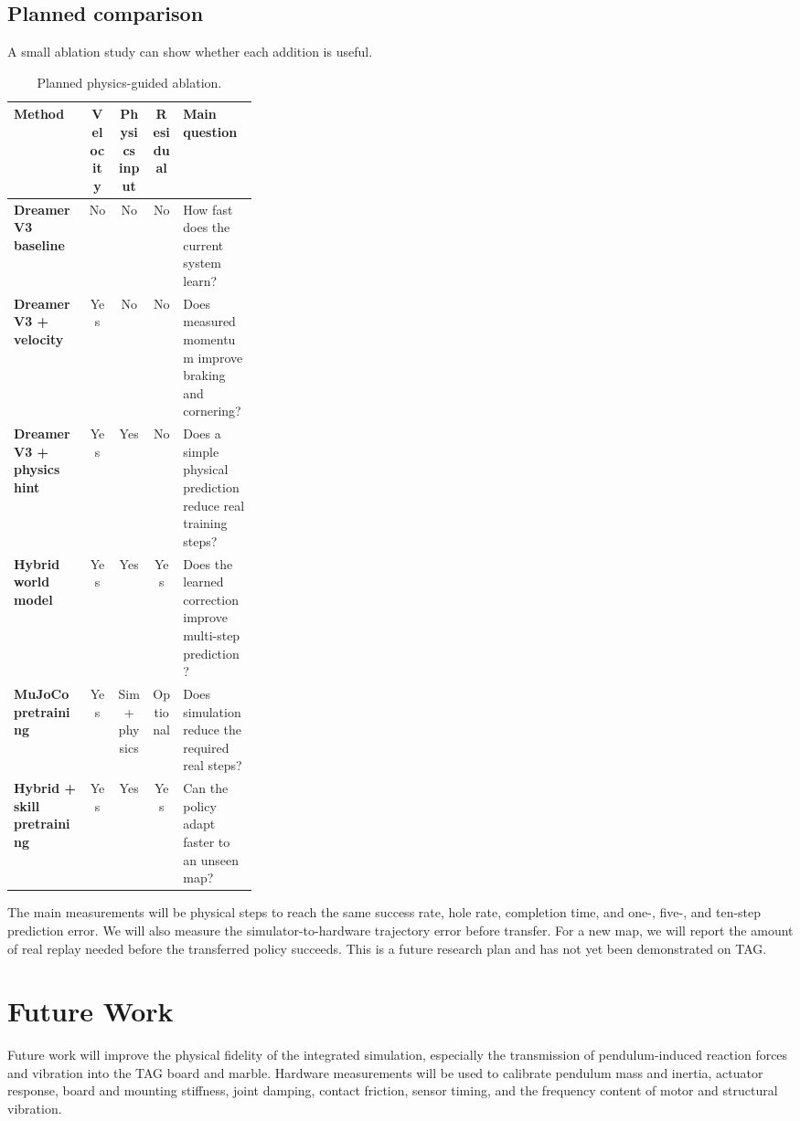 \documentclass[9pt]{extarticle}
\begin{document}
\subsection{Planned comparison}
A small ablation study can show whether each addition is useful.
\begin{table}[H]
\centering
\small
\caption{Planned physics-guided ablation.}
\begin{tabularx}{0.96\linewidth}{>{\bfseries}p{0.31\linewidth} c c c X}
\toprule
Method & Velocity & Physics input & Residual & Main question \\
\midrule
DreamerV3 baseline & No & No & No & How fast does the current system learn? \\
DreamerV3 + velocity & Yes & No & No & Does measured momentum improve braking and cornering? \\
DreamerV3 + physics hint & Yes & Yes & No & Does a simple physical prediction reduce real training steps? \\
Hybrid world model & Yes & Yes & Yes & Does the learned correction improve multi-step prediction? \\
MuJoCo pretraining & Yes & Sim + physics & Optional & Does simulation reduce the required real steps? \\
Hybrid + skill pretraining & Yes & Yes & Yes & Can the policy adapt faster to an unseen map? \\
\bottomrule
\end{tabularx}
\end{table}

The main measurements will be physical steps to reach the same success rate, hole rate, completion time, and one-, five-, and ten-step prediction error. We will also measure the simulator-to-hardware trajectory error before transfer. For a new map, we will report the amount of real replay needed before the transferred policy succeeds. This is a future research plan and has not yet been demonstrated on TAG.

\section{Future Work}
Future work will improve the physical fidelity of the integrated simulation, especially the transmission of pendulum-induced reaction forces and vibration into the TAG board and marble. Hardware measurements will be used to calibrate pendulum mass and inertia, actuator response, board and mounting stiffness, joint damping, contact friction, sensor timing, and the frequency content of motor and structural vibration.
\end{document}
